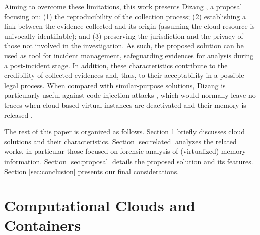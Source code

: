 \documentclass[conference]{IEEEtran}
\newcommand{\marcos}[1]{{\color{blue}{MARCOS: #1}}}
\newcommand{\fancyname}{Dizang }
\newcommand{\fancynameX}{\fancyname}
\begin{document}
%
Aiming to overcome these limitations, this work presents \fancynameX, a proposal focusing on: (1) the reproducibility of the collection process; (2) establishing a link between the evidence collected and its origin (assuming the cloud resource is univocally identifiable); and (3) preserving the jurisdiction and the privacy of those not involved in the investigation.
%
As such, the proposed solution can be used as tool for incident management, safeguarding evidences for analysis during a post-incident stage.
%
In addition, these characteristics contribute to the credibility of collected evidences and, thus, to their acceptability in a possible legal process.
%
%
%
When compared with similar-purpose solutions, \fancyname is particularly useful against code injection attacks \cite{Case_Memory_Forensics:2014}, which would normally leave no traces when cloud-based virtual instances are deactivated and their memory is released \cite{Vomel_Memory_Acquisition:2013,Case_Memory_Forensics:2014}.



The rest of this paper is organized as follows.
%
Section \ref{sec:cloud} briefly discusses cloud solutions and their characteristics.
%
Section \ref{sec:related} analyzes the related works, in particular those focused on forensic analysis of (virtualized) memory information.
%
Section \ref{sec:proposal} details the proposed solution and its features.
%
Section \ref{sec:conclusion} presents our final considerations.



\section{Computational Clouds and Containers}
\label{sec:cloud}
\end{document}
